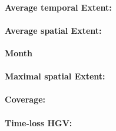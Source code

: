 \paragraph{Average temporal Extent:}
\paragraph{Average spatial Extent:}

\Large
\centerline{\textbf{Month}}
\normalsize

\paragraph{Maximal spatial Extent:}
\paragraph{Coverage:}
\paragraph{Time-loss HGV:}